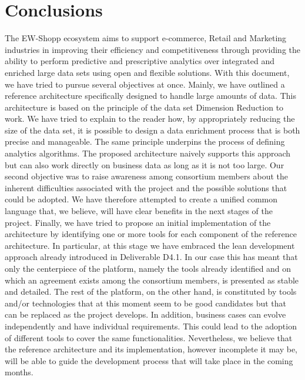 \section{Conclusions}
The EW-Shopp ecosystem aims to support e-commerce, Retail and Marketing industries in improving their efficiency and competitiveness through providing the ability to perform predictive and prescriptive analytics over integrated and enriched large data sets using open and flexible solutions. 
With this document, we have tried to pursue several objectives at once. Mainly, we have outlined a reference architecture specifically designed to handle large amounts of data. This architecture is based on the principle of the data set Dimension Reduction to work. We have tried to explain to the reader how, by appropriately reducing the size of the data set, it is possible to design a data enrichment process that is both precise and manageable. The same principle underpins the process of defining analytics algorithms. The proposed architecture naively supports this approach but can also work directly on business data as long as it is not too large.
Our second objective was to raise awareness among consortium members about the inherent difficulties associated with the project and the possible solutions that could be adopted. We have therefore attempted to create a unified common language that, we believe, will have clear benefits in the next stages of the project.
Finally, we have tried to propose an initial implementation of the architecture by identifying one or more tools for each component of the reference architecture. In particular, at this stage we have embraced the lean development approach already introduced in Deliverable D4.1. In our case this has meant that only the centerpiece of the platform, namely the tools already identified and on which an agreement exists among the consortium members, is presented as stable and detailed. The rest of the platform, on the other hand, is constituted by tools and/or technologies that at this moment seem to be good candidates but that can be replaced as the project develops. In addition, business cases can evolve independently and have individual requirements. This could lead to the adoption of different tools to cover the same functionalities. Nevertheless, we believe that the reference architecture and its implementation, however incomplete it may be, will be able to guide the development process that will take place in the coming months.
